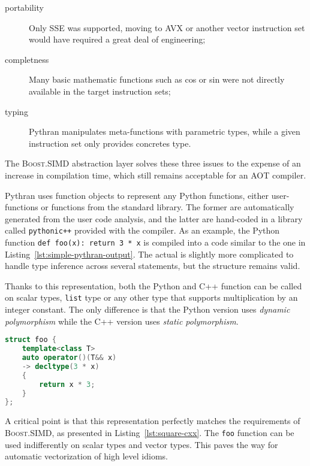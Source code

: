\documentclass[preprint]{sigplanconf}
\providecommand{\boostsimd}{\textsc{Boost.SIMD}}
\begin{document}
\begin{description}

    \item[portability] Only SSE was supported, moving to AVX or another vector
        instruction set would have required a great deal of engineering;

    \item[completness] Many basic mathematic functions such as cos or sin
        were not directly available in the target instruction sets;

    \item[typing] Pythran manipulates meta-functions with parametric types,
        while a given instruction set only provides concretes type.

\end{description}

The \boostsimd{} abstraction layer solves these three issues to the expense of
an increase in compilation time, which still remains acceptable for an AOT
compiler.

Pythran uses function objects to represent any Python functions, either
user-functions or functions from the standard library. The former are
automatically generated from the user code analysis, and the latter are
hand-coded in a library called \texttt{pythonic++} provided with the compiler.
As an example, the Python function \texttt{def foo(x): return 3 * x} is compiled
into a code similar to the one in Listing~\ref{lst:simple-pythran-output}. The
actual is slightly more complicated to handle type inference across several
statements, but the structure remains valid.

Thanks to this representation, both the Python and C++ function can be called
on scalar types, \texttt{list} type or any other type that supports
multiplication by an integer constant. The only difference is that the Python
version uses \emph{dynamic polymorphism} while the C++ version uses
\emph{static polymorphism}.

\begin{lstlisting}[language=c++, caption={Simplified Pythran Translation of a Polymorphic Function}, label={lst:simple-pythran-output}]
struct foo {
    template<class T>
    auto operator()(T&& x)
    -> decltype(3 * x)
    {
        return x * 3;
    }
};
\end{lstlisting}

A critical point is that this representation perfectly matches the requirements
of \boostsimd, as presented in Listing~\ref{lst:square-cxx}. The \texttt{foo}
function can be used indifferently on scalar types and vector types. This paves
the way for automatic vectorization of high level idioms.
\end{document}
